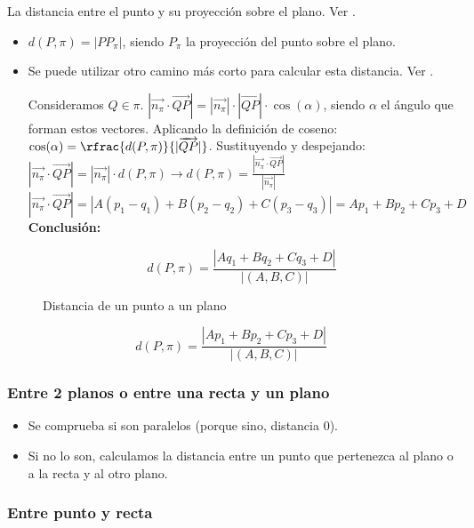 La distancia entre el punto y su proyección sobre el plano. Ver .



\begin{itemize}
  \item $d(P,\pi) = |PP_{\pi}|$, siendo $P_{\pi}$ la proyección del punto sobre el plano.
  \item Se puede utilizar otro camino más corto para calcular esta distancia. Ver .

  \subitem Consideramos $Q\in\pi$.
  \subitem $|\vec{n_{\pi}}·\vec{QP}| = |\vec{n_{\pi}}|·|\vec{QP}|·\cos(\alpha)$, siendo $\alpha$ el ángulo que forman estos vectores.
  \subitem Aplicando la definición de coseno: $\cos(\alpha) = \rfrac{d(P,\pi)}{|\vec{QP}|}$.
  \subitem Sustituyendo y despejando: $|\vec{n_{\pi}}·\vec{QP}| = |\vec{n_{\pi}}|·d(P,\pi) \to d(P,\pi) = \frac{|\vec{n_{\pi}}·\vec{QP}|}{|\vec{n_{\pi}}|}$
  \subitem $|\vec{n_{\pi}}·\vec{QP}| = |A(p_1-q_1) + B(p_2-q_2) + C(p_3-q_3)| = Ap_1+Bp_2+Cp_3+D$
  \subitem \textbf{Conclusión:}

  \[
    d(P,\pi) = \frac{|Aq_1+Bq_2+Cq_3+D|}{|(A,B,C)|}
  \]
\end{itemize}

\begin{figure}[hbtp]
\centering
{}

\label{fig::dist-punto-plano}
\caption{Distancia de un punto a un plano}
\end{figure}

\[d(P,\pi) = \frac{|Ap_1+Bp_2+Cp_3+D|}{|(A,B,C)|}\]

\subsubsection{Entre 2 planos o entre una recta y un plano}

\begin{itemize}
  \item Se comprueba si son paralelos (porque sino, distancia 0).
  \item Si no lo son, calculamos la distancia entre un punto que pertenezca al plano o a la recta y al otro plano.
\end{itemize}

\subsubsection{Entre punto y recta}

